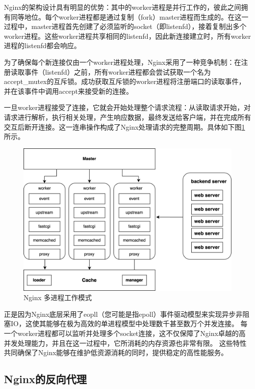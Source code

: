 Nginx的架构设计具有明显的优势：其中的worker进程是并行工作的，彼此之间拥有同等地位。每个worker进程都是通过复制（fork）master进程而生成的。在这一过程中，master进程首先创建了必须监听的socket（即listenfd），接着复制出多个worker进程。这些worker进程共享相同的listenfd，因此新连接建立时，所有worker进程的listenfd都会响应。

为了确保每个新连接仅由一个worker进程处理，Nginx采用了一种竞争机制：在注册读取事件（listenfd）之前，所有worker进程都会尝试获取一个名为accept\_mutex的互斥锁。成功获取互斥锁的worker进程将注册端口的读取事件，并在该事件中调用accept来接受新的连接。

一旦worker进程接受了连接，它就会开始处理整个请求流程：从读取请求开始，对请求进行解析，执行相关处理，产生响应数据，最终发送给客户端，并在完成所有交互后断开连接。这一连串操作构成了Nginx处理请求的完整周期。具体如下图\ref{nginx_multi_process}所示。

\begin{figure}[htbp]
	\centering
	\includegraphics[width=\textwidth]{figures/master-worker.png}
	\caption{Nginx 多进程工作模式}
	\label{nginx_multi_process}
\end{figure}

正是因为Nginx底层采用了eopll（您可能是指epoll）事件驱动模型来实现异步非阻塞IO，这使其能够在极为高效的单进程模型中处理数千甚至数万个并发连接。
每一个worker进程都可以监听并处理多个socket连接，这不仅保障了Nginx卓越的高并发处理能力，并且在这一过程中，它所消耗的内存资源也非常有限\cite{张炜森2018nginx}。
这些特性共同确保了Nginx能够在维护低资源消耗的同时，提供稳定的高性能服务。

\subsection{Nginx的反向代理}

